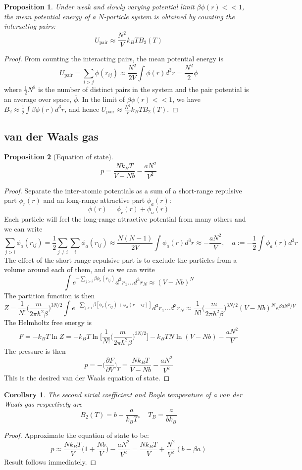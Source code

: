 \documentclass[a4paper]{article}
\theoremstyle{new}
\newtheorem{prop}{Proposition}[section]
\newtheorem{cor}{Corollary}[section]
\begin{document}
\begin{prop}
Under weak and slowly varying potential limit $\beta\phi(r)<<1$, the mean potential energy of a $N$-particle system is obtained by counting the interacting pairs:
$$U_{\text{pair}}\approx\frac{N^2}{V}k_BTB_2(T)$$
\end{prop}
\begin{proof}
From counting the interacting pairs, the mean potential energy is
$$U_{\text{pair}}=\sum_{i>j}\phi(r_{ij})\approx\frac{N^2}{2V}\int\phi(r)d^3r=\frac{N^2}{2}\overline{\phi}$$
where $\frac{1}{2}N^2$ is the number of distinct pairs in the system and the pair potential is an average over space, $\overline{\phi}$. In the limit of $\beta\phi(r)<<1$, we have $B_2\approx\frac{1}{2}\int\beta\phi(r)d^3r$, and hence $U_{\text{pair}}\approx\frac{N^2}{V}k_BTB_2(T)$.
\end{proof}
\newpage
\subsection{van der Waals gas}
\begin{prop}[Equation of state]
$$p=\frac{Nk_BT}{V-Nb}-\frac{aN^2}{V^2}$$
\end{prop}
\begin{proof}
Separate the inter-atomic potentials as a sum of a short-range repulsive part $\phi_r(r)$ and an long-range attractive part $\phi_a(r)$:
$$\phi(r)=\phi_r(r)+\phi_a(r)$$
Each particle will feel the long-range attractive potential from many others and we can write
$$\sum_{j>i}\phi_a(r_{ij})=\frac{1}{2}\sum_{j\neq i}\sum_i\phi_a(r_{ij})\approx\frac{N(N-1)}{2V}\int\phi_a(r)d^3r\approx-\frac{aN^2}{V},\quad a:=-\frac{1}{2}\int\phi_a(r)d^3r$$
The effect of the short range repulsive part is to exclude the particles from a volume around each of them, and so we can write
$$\int e^{-\sum_{j>i}\beta\phi_r(r_{ij})}d^3r_1\dots d^3r_N\approx (V-Nb)^N$$
The partition function is then
$$Z=\frac{1}{N!}\bigg(\frac{m}{2\pi\hbar^2\beta}\bigg)^{3N/2}\int e^{-\sum_{j>i}\beta[\phi_r(r_{ij})+\phi_a(r-{ij})]}d^3r_1\dots d^3r_N\approx\frac{1}{N!}\bigg(\frac{m}{2\pi\hbar^2\beta}\bigg)^{3N/2}(V-Nb)^Ne^{\beta aN^2/V}$$
The Helmholtz free energy is
$$F=-k_BT\ln Z=-k_BT\ln\bigg[\frac{1}{N!}\bigg(\frac{m}{2\pi\hbar^2\beta}\bigg)^{3N/2}\bigg]-k_BTN\ln(V-Nb)-\frac{aN^2}{V}$$
The pressure is then
$$p=-\bigg(\frac{\partial F}{\partial V}\bigg)_T=\frac{Nk_BT}{V-Nb}-\frac{aN^2}{V^2}$$
This is the desired van der Waals equation of state.
\end{proof}
\begin{cor}
The second virial coefficient and Boyle temperature of a van der Waals gas respectively are
$$B_2(T)=b-\frac{a}{k_BT},\quad T_B=\frac{a}{bk_B}$$
\end{cor}
\begin{proof}
Approximate the equation of state to be:
$$p\approx\frac{Nk_BT}{V}\bigg(1+\frac{Nb}{V}\bigg)-\frac{aN^2}{V^2}=\frac{Nk_BT}{V}+\frac{N^2}{V^2}(b-\beta a)$$
Result follows immediately.
\end{proof}
\newpage
\end{document}
